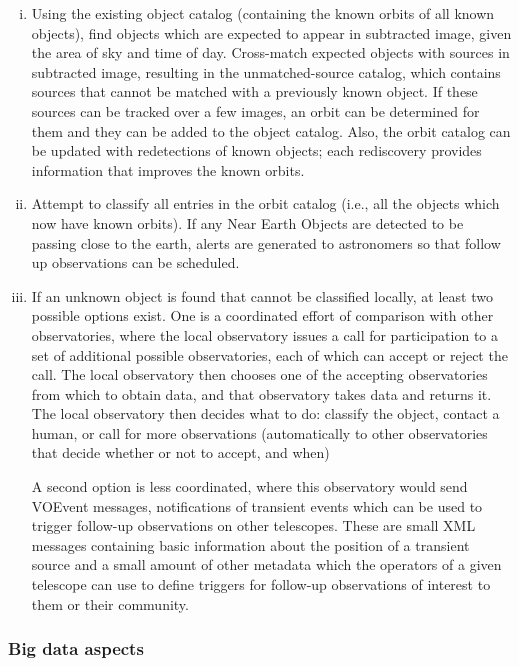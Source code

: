 \begin{enumerate}[(i)]

\item Using the existing object catalog (containing the known orbits of all known objects), find objects which are expected to appear in subtracted image, given the area of sky and time of day.
Cross-match expected objects with sources in subtracted image, resulting in the unmatched-source catalog, which contains sources that cannot be matched with a previously known object.  If these sources can be tracked over a few images, an orbit can be determined for them and they can be added to the object catalog.  Also, the orbit catalog can be updated with redetections of known objects; each rediscovery provides information that improves the known orbits.

\item Attempt to classify all entries in the orbit catalog (i.e., all the objects which now have known orbits). If any Near Earth Objects are detected to be passing close to the earth, alerts are generated to astronomers so that follow up observations can be scheduled.

\item If an unknown object is found that cannot be classified locally, at least two possible options exist. One is a coordinated effort of comparison with other observatories, where the local observatory issues a call for participation to a set of additional possible observatories, each of which can accept or reject the call.  The local observatory then chooses one of the accepting observatories from which to obtain data, and that observatory takes data and returns it. The local observatory then decides what to do: classify the object, contact a human, or call for more observations (automatically to other observatories that decide whether or not to accept, and when)

A second option is less coordinated, where this observatory would send VOEvent
messages, notifications of transient events which can be used to
trigger follow-up observations on other telescopes. These are small XML messages
containing basic information about the position of a transient source and a
small amount of other metadata which the operators of a given telescope can use
to define triggers for follow-up observations of interest to them or their
community.

\end{enumerate}

 \subsubsection*{Big data aspects}

